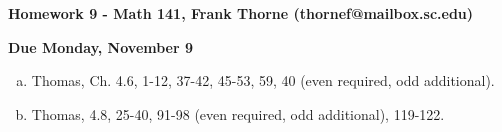 \documentclass[12pt]{article}
\begin{document}
\setlength{\topmargin}{-2mm}





\begin{center}{\bf Homework 9 - Math 141, Frank Thorne (thornef@mailbox.sc.edu)}
\end{center}
\begin{center}
{\bf Due Monday, November 9}
\end{center}

\begin{enumerate}[(a)]



\item
Thomas, Ch. 4.6, 1-12, 37-42, 45-53, 59, 40 (even required, odd additional).

\item
Thomas, 4.8, 25-40, 91-98 (even required, odd additional), 119-122.



\end{enumerate}
\end{document}
